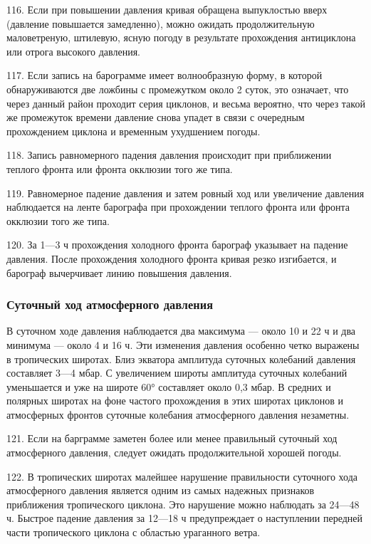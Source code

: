 116. Если при повышении давления кривая обращена выпуклостью вверх (давление повышается замедленно), можно ожидать продолжительную маловетреную, штилевую, ясную погоду в результате прохождения антициклона или отрога высокого давления.

117. Если запись на барограмме имеет волнообразную форму, в которой обнаруживаются две ложбины с промежутком около 2 суток, это означает, что через данный район проходит серия циклонов, и весьма вероятно, что через такой же промежуток времени давление снова упадет в связи с очередным прохождением циклона и временным ухудшением погоды.

118. Запись равномерного падения давления происходит при приближении теплого фронта или фронта окклюзии того же типа.

119. Равномерное падение давления и затем ровный ход или увеличение давления наблюдается на ленте барографа при прохождении теплого фронта или фронта окклюзии того же типа.

120. За 1—3 ч прохождения холодного фронта барограф указывает на падение давления. После прохождения холодного фронта кривая резко изгибается, и барограф вычерчивает линию повышения давления.

\subsubsection{Суточный ход атмосферного давления}

В суточном ходе давления наблюдается два максимума — около 10 и 22 ч и два минимума — около 4 и 16 ч. Эти изменения давления особенно четко выражены в тропических широтах. Близ экватора амплитуда суточных колебаний давления составляет 3—4 мбар. С увеличением широты амплитуда суточных колебаний уменьшается и уже на широте 60° составляет около 0,3 мбар. В средних и полярных широтах на фоне частого прохождения в этих широтах циклонов и атмосферных фронтов суточные колебания атмосферного давления незаметны.

121. Если на барграмме заметен более или менее правильный суточный ход атмосферного давления, следует ожидать продолжительной хорошей погоды.

122. В тропических широтах малейшее нарушение правильности суточного хода атмосферного давления является одним из самых надежных признаков приближения тропического циклона. Это нарушение можно наблюдать за 24—48 ч. Быстрое падение давления за 12—18 ч предупреждает о наступлении передней части тропического циклона с областью ураганного ветра.

